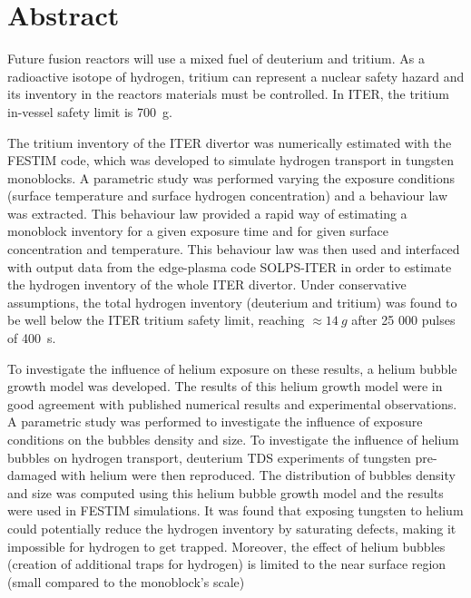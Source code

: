 \chapter*{Abstract}

Future fusion reactors will use a mixed fuel of deuterium and tritium.
As a radioactive isotope of hydrogen, tritium can represent a nuclear safety hazard and its inventory in the reactors materials must be controlled.
In ITER, the tritium in-vessel safety limit is \SI{700}{g}.

The tritium inventory of the ITER divertor was numerically estimated with the FESTIM code, which was developed to simulate hydrogen transport in tungsten monoblocks.
A parametric study was performed varying the exposure conditions (surface temperature and surface hydrogen concentration) and a behaviour law was extracted.
This behaviour law provided a rapid way of estimating a monoblock inventory for a given exposure time and for given surface concentration and temperature.
This behaviour law was then used and interfaced with output data from the edge-plasma code SOLPS-ITER in order to estimate the hydrogen inventory of the whole ITER divertor.
Under conservative assumptions, the total hydrogen inventory (deuterium and tritium) was found to be well below the ITER tritium safety limit, reaching $\approx \SI{14}{g}$ after 25 000 pulses of \SI{400}{s}.

To investigate the influence of helium exposure on these results, a helium bubble growth model was developed.
The results of this helium growth model were in good agreement with published numerical results and experimental observations.
A parametric study was performed to investigate the influence of exposure conditions on the bubbles density and size.
To investigate the influence of helium bubbles on hydrogen transport, deuterium TDS experiments of tungsten pre-damaged with helium were then reproduced.
The distribution of bubbles density and size was computed using this helium bubble growth model and the results were used in FESTIM simulations.
It was found that exposing tungsten to helium could potentially reduce the hydrogen inventory by saturating defects, making it impossible for hydrogen to get trapped.
Moreover, the effect of helium bubbles (creation of additional traps for hydrogen) is limited to the near surface region (small compared to the monoblock's scale)
